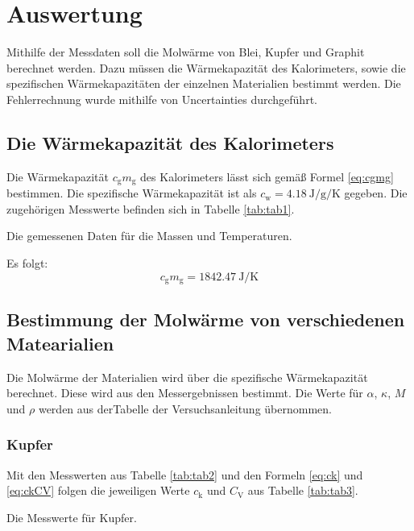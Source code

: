 
\section{Auswertung}
\label{sec:Auswertung}

Mithilfe der Messdaten soll die Molwärme von Blei, Kupfer und Graphit berechnet werden. Dazu müssen die Wärmekapazität des Kalorimeters, sowie die spezifischen Wärmekapazitäten der einzelnen Materialien bestimmt werden.
Die Fehlerrechnung wurde mithilfe von Uncertainties \cite{uncertainties} durchgeführt.

\subsection{Die Wärmekapazität des Kalorimeters}

Die Wärmekapazität $c_\text{g}m_\text{g}$ des Kalorimeters lässt sich gemäß Formel \eqref{eq:cgmg} bestimmen. Die spezifische Wärmekapazität ist als $c_\text{w} = \SI{4.18}{\joule\per\gram\per\kelvin}$ \cite{V201} gegeben. Die zugehörigen Messwerte befinden sich in Tabelle \ref{tab:tab1}.

\begin{table}
	\centering
	\caption{Die gemessenen Daten für die Massen und Temperaturen.}
	
	\label{tab:tab1}
\end{table}

Es folgt:
\begin{displaymath}
	c_\text{g}m_\text{g} = \SI{1842,47}{\joule\per\kelvin}
\end{displaymath}

\subsection{Bestimmung der Molwärme von verschiedenen Matearialien}

Die Molwärme der Materialien wird über die spezifische Wärmekapazität berechnet. Diese wird aus den Messergebnissen bestimmt.
Die Werte für $\alpha$, $\kappa$, $M$ und $\rho$ werden aus derTabelle der Versuchsanleitung übernommen\cite{V201}.

\subsubsection{Kupfer}

Mit den Messwerten aus Tabelle \ref{tab:tab2} und den Formeln \eqref{eq:ck} und \eqref{eq:ckCV} folgen die jeweiligen Werte $c_\text{k}$ und $C_\text{V}$ aus Tabelle \ref{tab:tab3}.
\begin{table}
	\centering
	\caption{Die Messwerte für Kupfer.}
	
	\label{tab:tab2}
\end{table}

